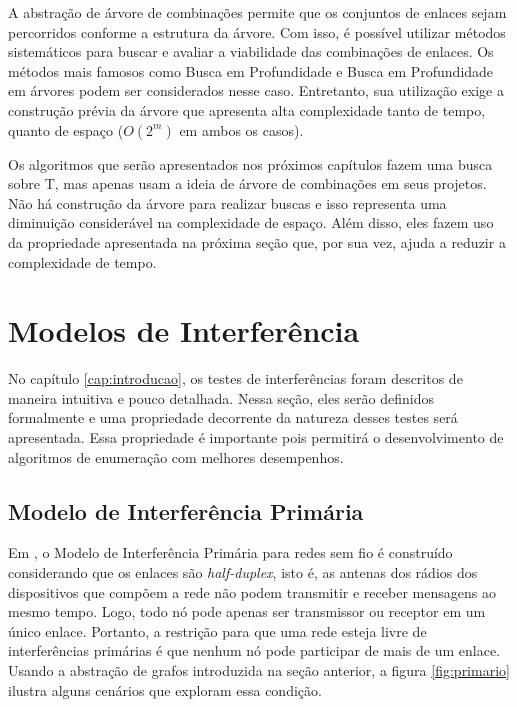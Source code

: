 A abstração de árvore de combinações permite que os conjuntos de enlaces sejam percorridos conforme a estrutura da árvore. Com isso, é possível utilizar métodos sistemáticos para buscar e avaliar a viabilidade das combinações de enlaces. Os métodos mais famosos como Busca em Profundidade e Busca em Profundidade em árvores podem ser considerados nesse caso. Entretanto, sua utilização exige a construção prévia da árvore que apresenta alta complexidade tanto de tempo, quanto de espaço ($O(2^m)$ em ambos os casos).

Os algoritmos que serão apresentados nos próximos capítulos fazem uma busca sobre T, mas apenas usam a ideia de árvore de combinações em seus projetos. Não há construção da árvore para realizar buscas e isso representa uma diminuição considerável na complexidade de espaço. Além disso, eles fazem uso da propriedade apresentada na próxima seção que, por sua vez, ajuda a reduzir a complexidade de tempo.

\section{Modelos de Interferência}
\label{section:interference}

No capítulo \ref{cap:introducao}, os testes de interferências foram descritos de maneira intuitiva e pouco detalhada. Nessa seção, eles serão definidos formalmente e uma propriedade decorrente da natureza desses testes será apresentada. Essa propriedade é importante pois permitirá o desenvolvimento de algoritmos de enumeração com melhores desempenhos.

\subsection{Modelo de Interferência Primária}

Em \cite{primary}, o Modelo de Interferência Primária para redes sem fio é construído considerando que os enlaces são {\it half-duplex}, isto é, as antenas dos rádios dos dispositivos que compõem a rede não podem transmitir e receber mensagens ao mesmo tempo. Logo, todo nó pode apenas ser transmissor ou receptor em um único enlace. Portanto, a restrição para que uma rede esteja livre de interferências primárias é que nenhum nó pode participar de mais de um enlace. Usando a abstração de grafos introduzida na seção anterior, a figura \ref{fig:primario} ilustra alguns cenários que exploram essa condição.

